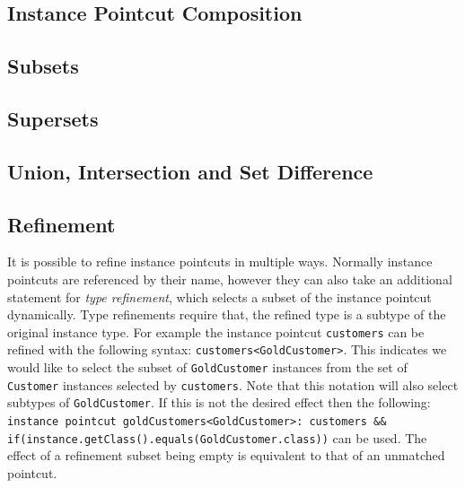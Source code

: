 \documentclass{llncs}
\begin{document}
\subsection{Instance Pointcut Composition}

\subsection{Subsets}


\subsection{Supersets}


\subsection{Union, Intersection and Set Difference}


\subsection{Refinement} 
It is possible to refine instance pointcuts in multiple ways. Normally instance pointcuts are referenced by their name, however they can also take an additional statement for \emph{type refinement}, which selects a subset of the instance pointcut dynamically. Type refinements require that, the refined type is a subtype of the original instance type. For example the instance pointcut \texttt{customers} can be refined with the following syntax: \lstinline!customers<GoldCustomer>!. 
This indicates we would like to select the subset of \texttt{GoldCustomer} instances from the set of \texttt{Customer} instances selected by \texttt{customers}. 
Note that this notation will also select subtypes of \texttt{GoldCustomer}. 
If this is not the desired effect then the following: \lstinline!instance pointcut goldCustomers<GoldCustomer>: customers && if(instance.getClass().equals(GoldCustomer.class))! can be used. 
The effect of a refinement subset being empty is equivalent to that of an unmatched pointcut. 
\end{document}

